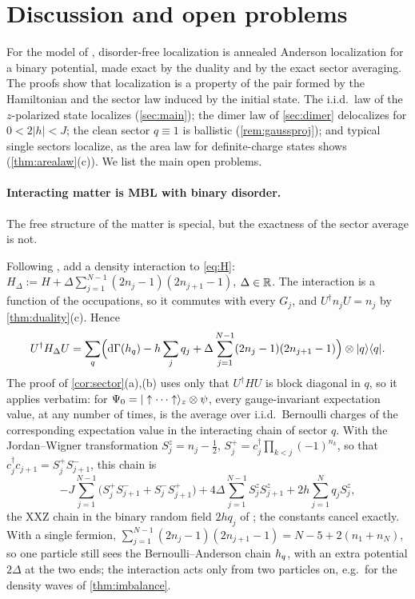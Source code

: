 \providecommand{\Sfm}{S_{f}}

\section{Discussion and open problems}\label{sec:discussion}

For the model of \cite{SKKM2017}, disorder-free localization is annealed Anderson localization for a binary
potential, made exact by the duality and by the exact sector averaging.  The proofs show that localization is a
property of the pair formed by the Hamiltonian and the sector law induced by the initial state.  The i.i.d.\ law of
the $z$-polarized state localizes (\cref{sec:main}); the dimer law of \cref{sec:dimer} delocalizes for $0<2|h|<J$;
the clean sector $q\equiv1$ is ballistic (\cref{rem:gaussproj}); and typical single sectors localize, as the area
law for definite-charge states shows (\cref{thm:arealaw}(c)).  We list the main open problems.

\paragraph{Interacting matter is MBL with binary disorder.}
The free structure of the matter is special, but the exactness of the sector average is not.

\begin{remark}\label{rem:interacting}
Following \cite{SKKM2017b}, add a density interaction to \eqref{eq:H}:
$H_\Delta:=H+\Delta\sum_{j=1}^{N-1}(2n_j-1)(2n_{j+1}-1)$, $\Delta\in\mathbb{R}$.  The interaction is a function of the
occupations, so it commutes with every $G_j$, and $U^\dagger n_jU=n_j$ by \cref{thm:duality}(c).  Hence
\[
  U^\dagger H_\Delta U=\sum_q\Bigl(\mathrm{d}\Gamma(h_{q})-h\sum_jq_j+\Delta\sum_{j=1}^{N-1}(2n_j-1)(2n_{j+1}-1)\Bigr)\otimes|q\rangle\langle q| .
\]
The proof of \cref{cor:sector}(a),(b) uses only that $U^\dagger HU$ is block diagonal in $q$, so it applies verbatim:
for $\Psi_0=|\uparrow\cdots\uparrow\rangle_z\otimes\psi$, every gauge-invariant expectation value, at any number of times,
is the average over i.i.d.\ Bernoulli charges of the corresponding expectation value in the interacting chain of
sector $q$.  With the Jordan--Wigner transformation $S^z_j=n_j-\frac12$, $S^+_j=c_j^\dagger\prod_{k<j}(-1)^{n_k}$, so
that $c_j^\dagger c_{j+1}=S^+_jS^-_{j+1}$, this chain is
\[
  -J\sum_{j=1}^{N-1}\bigl(S^+_jS^-_{j+1}+S^-_jS^+_{j+1}\bigr)+4\Delta\sum_{j=1}^{N-1}S^z_jS^z_{j+1}+2h\sum_{j=1}^Nq_jS^z_j,
\]
the XXZ chain in the binary random field $2hq_j$ of \cite[Eq.~(5)]{SKKM2017b}; the constants cancel exactly.
With a single fermion, $\sum_{j=1}^{N-1}(2n_j-1)(2n_{j+1}-1)=N-5+2(n_1+n_N)$, so one particle still sees the
Bernoulli--Anderson chain $h_{q}$, with an extra potential $2\Delta$ at the two ends; the interaction acts only from two
particles on, e.g.\ for the density waves of \cref{thm:imbalance}.
\end{remark}

